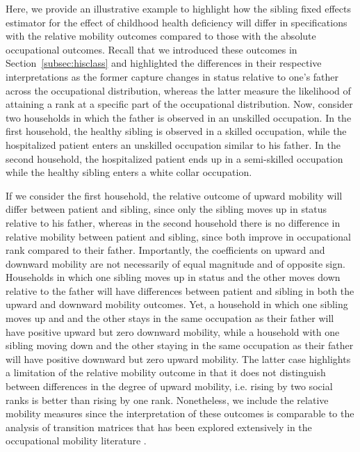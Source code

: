 \documentclass[12pt,english]{article}
\begin{document}
Here, we provide an illustrative example to highlight how the sibling fixed effects estimator for the effect of childhood health deficiency will differ in specifications with the relative mobility outcomes compared to those with the absolute occupational outcomes. Recall that we introduced these outcomes in Section~\ref{subsec:hisclass} and highlighted the differences in their respective interpretations as the former capture changes in status relative to one's father across the occupational distribution, whereas the latter measure the likelihood of attaining a rank at a specific part of the occupational distribution. Now, consider two households in which the father is observed in an unskilled occupation. In the first household, the healthy sibling is observed in a skilled occupation, while the hospitalized patient enters an unskilled occupation similar to his father. In the second household, the hospitalized patient ends up in a semi-skilled occupation while the healthy sibling enters a white collar occupation. 

If we consider the first household, the relative outcome of upward mobility will differ between patient and sibling, since only the sibling moves up in status relative to his father, whereas in the second household there is no difference in relative mobility between patient and sibling, since both improve in occupational rank compared to their father. Importantly, the coefficients on upward and downward mobility are not necessarily of equal magnitude and of opposite sign. Households in which one sibling moves up in status and the other moves down relative to the father will have differences between patient and sibling in both the upward and downward mobility outcomes. Yet, a household in which one sibling moves up and and the other stays in the same occupation as their father will have positive upward but zero downward mobility, while a household with one sibling moving down and the other staying in the same occupation as their father will have positive downward but zero upward mobility. The latter case highlights a limitation of the relative mobility outcome in that it does not distinguish between differences in the degree of upward mobility, i.e. rising by two social ranks is better than rising by one rank. Nonetheless, we include the relative mobility measures since the interpretation of these outcomes is comparable to the analysis of transition matrices that has been explored extensively in the occupational mobility literature \citep{LongFerrie2013, Feigenbaum2018, Perez2019}. 
\end{document}
